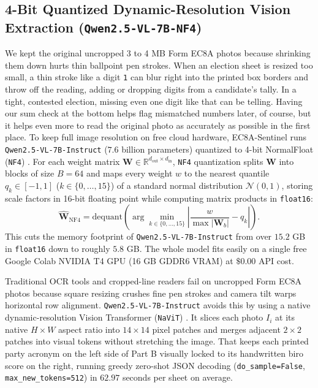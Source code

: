 \documentclass{article}
\begin{document}
\subsection{4-Bit Quantized Dynamic-Resolution Vision Extraction (\texttt{Qwen2.5-VL-7B-NF4})}

We kept the original uncropped 3 to 4 MB Form EC8A photos because shrinking them down hurts thin ballpoint pen strokes. When an election sheet is resized too small, a thin stroke like a digit \texttt{1} can blur right into the printed box borders and throw off the reading, adding or dropping digits from a candidate's tally. In a tight, contested election, missing even one digit like that can be telling. Having our sum check at the bottom helps flag mismatched numbers later, of course, but it helps even more to read the original photo as accurately as possible in the first place. To keep full image resolution on free cloud hardware, EC8A-Sentinel runs \texttt{Qwen2.5-VL-7B-Instruct} ($7.6$ billion parameters) \cite{bai2025qwen25vl} quantized to 4-bit NormalFloat (\texttt{NF4}) \cite{dettmers2023qlora}. For each weight matrix $\mathbf{W} \in \mathbb{R}^{d_{\text{out}} \times d_{\text{in}}}$, \texttt{NF4} quantization splits $\mathbf{W}$ into blocks of size $B = 64$ and maps every weight $w$ to the nearest quantile $q_k \in [-1, 1]$ ($k \in \{0, \dots, 15\}$) of a standard normal distribution $\mathcal{N}(0, 1)$, storing scale factors in 16-bit floating point while computing matrix products in \texttt{float16}:
\begin{equation}
\hat{\mathbf{W}}_{\text{NF4}} = \text{dequant}\!\left(\arg\min_{k \in \{0,\dots,15\}} \left| \frac{w}{\max |\mathbf{W}_b|} - q_k \right|\right).
\label{eq:nf4}
\end{equation}
This cuts the memory footprint of \texttt{Qwen2.5-VL-7B-Instruct} from over $15.2$ GB in \texttt{float16} down to roughly $5.8$ GB. The whole model fits easily on a single free Google Colab NVIDIA T4 GPU (16 GB GDDR6 VRAM) at $\$0.00$ API cost.

Traditional OCR tools and cropped-line readers \cite{li2023trocr,zhou2026real5omnidocbench,kimani2022using} fail on uncropped Form EC8A photos because square resizing crushes fine pen strokes and camera tilt warps horizontal row alignment. \texttt{Qwen2.5-VL-7B-Instruct} avoids this by using a native dynamic-resolution Vision Transformer (\texttt{NaViT}) \cite{dehghani2023navit,bai2025qwen25vl}. It slices each photo $I_i$ at its native $H \times W$ aspect ratio into $14 \times 14$ pixel patches and merges adjacent $2 \times 2$ patches into visual tokens without stretching the image. That keeps each printed party acronym on the left side of Part B visually locked to its handwritten biro score on the right, running greedy zero-shot JSON decoding (\texttt{do\_sample=False}, \texttt{max\_new\_tokens=512}) in $62.97$ seconds per sheet on average.
\end{document}

